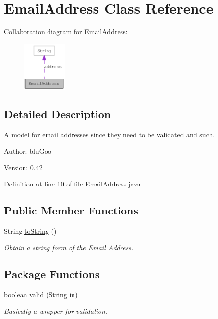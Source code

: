 \hypertarget{classEmailAddress}{
\section{EmailAddress Class Reference}
\label{classEmailAddress}
}
Collaboration diagram for EmailAddress:\nopagebreak
\begin{figure}[H]
\begin{center}
\leavevmode
\includegraphics[width=63pt]{classEmailAddress__coll__graph}
\end{center}
\end{figure}


\subsection{Detailed Description}
A model for email addresses since they need to be validated and such. 

\begin{Desc}
\item[Author:]bluGoo \end{Desc}
\begin{Desc}
\item[Version:]0.42 \end{Desc}


Definition at line 10 of file EmailAddress.java.\subsection*{Public Member Functions}
\begin{CompactItemize}
\item 
String \hyperlink{classEmailAddress_3b6332aa12291f135762d3008a86151a}{toString} ()
\begin{CompactList}\small\item\em Obtain a string form of the \hyperlink{classEmail}{Email} Address. \item\end{CompactList}\end{CompactItemize}
\subsection*{Package Functions}
\begin{CompactItemize}
\item 
boolean \hyperlink{classEmailAddress_978fb2eb409f4b5e85c8865302f791c8}{valid} (String in)
\begin{CompactList}\small\item\em Basically a wrapper for validation. \item\end{CompactList}\end{CompactItemize}
